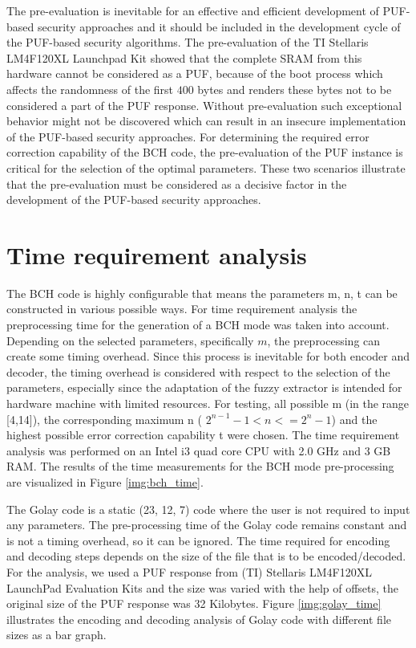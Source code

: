 The pre-evaluation is inevitable for an effective and efficient development of PUF-based security approaches and it should be included in the development cycle of the PUF-based security algorithms. The pre-evaluation of the TI Stellaris LM4F120XL Launchpad Kit showed that the complete SRAM from this hardware cannot be considered as a PUF, because of the boot process which affects the randomness of the first  $400$ bytes and renders these bytes not to be considered a part of the PUF response.
Without pre-evaluation such exceptional behavior might not be discovered which can result in an insecure implementation of the PUF-based security approaches. For determining the required error correction capability of the BCH code, the pre-evaluation of the PUF instance is critical for the selection of the optimal parameters. These two scenarios illustrate that the pre-evaluation must be considered as a decisive factor in the development of the PUF-based security approaches.


\section{Time requirement analysis}

The BCH code is highly configurable that means the parameters m, n, t can be constructed in various possible ways. For time requirement analysis the preprocessing time for the generation of a BCH mode was taken into account. Depending on the selected parameters, specifically $m$, the preprocessing can create some timing overhead. Since this process is inevitable for both encoder and decoder, the timing overhead is considered with respect to the selection of the parameters, especially since
the adaptation of the fuzzy extractor is intended for hardware machine with limited resources. For testing, all possible m (in the range [4,14]), the corresponding maximum n ( $2^{n-1} - 1 < n <= 2^{n} - 1$) and the highest possible error correction capability t were chosen. The time requirement analysis was performed on an Intel i3 quad core CPU with 2.0 GHz and 3 GB RAM. The results of the time measurements for the BCH mode pre-processing are visualized in Figure \ref{img:bch_time}.

The Golay code is a static (23, 12, 7) code where the user is not required to input any parameters. The pre-processing time of the Golay code remains constant and is not a timing overhead, so it can be ignored. The time required for encoding and decoding steps depends on the size of the file that is to be encoded/decoded. For the analysis, we used a PUF response from (TI) Stellaris LM4F120XL LaunchPad Evaluation Kits and the size was varied with the help of offsets, the original size of
the PUF response was 32 Kilobytes. Figure \ref{img:golay_time} illustrates the encoding and decoding analysis of Golay code with different file sizes as a bar graph.\\


